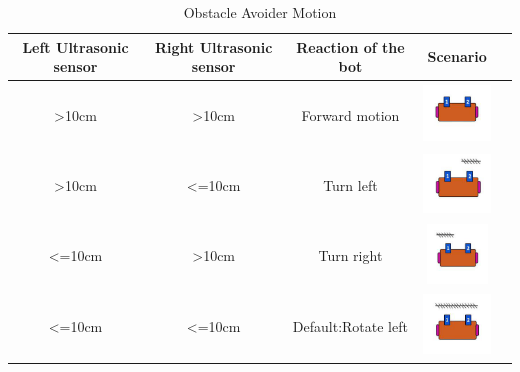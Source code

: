 \begin{table}
    \renewcommand{\arraystretch}{3.5}
    \centering
    \begin{tabular}{|c|c|c|c|c|}
    \hline
        \textbf{Left Ultrasonic sensor} & \textbf{Right Ultrasonic sensor} & \textbf{Reaction of the bot} & \textbf{Scenario} \\ \hline
        >10cm & >10cm & Forward motion & \begin{minipage}{.3\textwidth}
            \centering
            \includegraphics[width=\linewidth, height=16mm]{Images/Ultrasonic/ultraSonic_objAvoider_straight.png}
            \vspace{1mm}
        \end{minipage} \\ \hline
        >10cm & <=10cm & Turn left & \begin{minipage}{.3\textwidth}
            \centering
            \includegraphics[width=\linewidth, height=16mm]{Images/Ultrasonic/ultraSonic_objAvoider_left.png.png}
            \vspace{1mm}
        \end{minipage}  \\ \hline
        <=10cm & >10cm & Turn right & \begin{minipage}{.3\textwidth}
            \centering
            \includegraphics[width=\linewidth, height=16mm]{Images/Ultrasonic/ultraSonic_objAvoider_right.png}
            \vspace{1mm}
        \end{minipage}  \\ \hline
        <=10cm & <=10cm & Default:Rotate left & \begin{minipage}{.3\textwidth}
            \centering
            \includegraphics[width=\linewidth, height=16mm]{Images/Ultrasonic/ultraSonic_objAvoider_rotate.png}
            \vspace{1mm}
        \end{minipage}  \\ \hline
    \end{tabular}
    \vspace{9mm}
    \caption{Obstacle Avoider Motion}
    \label{tab: obj_avoider_motion}
\end{table}

